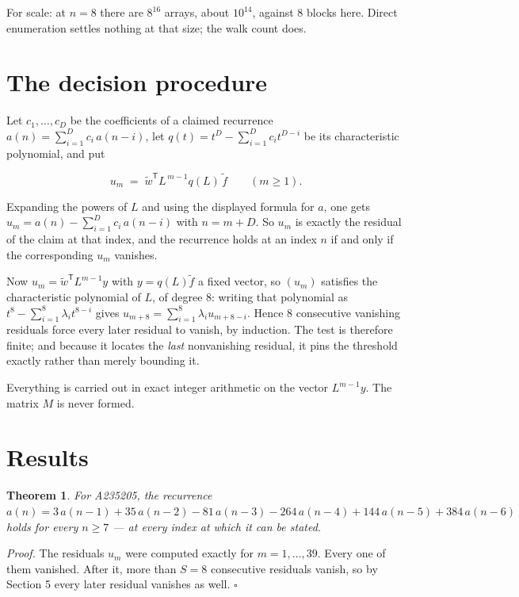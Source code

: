 \documentclass[11pt]{article}
\newtheorem{theorem}{Theorem}
\theoremstyle{definition}
\begin{document}
For scale: at $n = 8$ there are $8^{16}$ arrays, about $10^{14}$, against $8$ blocks here. Direct enumeration settles nothing at that size; the walk count does.

\section{The decision procedure}

Let $c_1,\dots,c_D$ be the coefficients of a claimed recurrence $a(n) = \sum_{i=1}^{D} c_i\,a(n-i)$, let $q(t) = t^{D} - \sum_{i=1}^{D} c_i t^{D-i}$ be its characteristic polynomial, and put

\[u_m \;=\; \tilde w^{\mathsf T} L^{\,m-1} q(L)\,\tilde f \qquad (m \ge 1).\]

Expanding the powers of $L$ and using the displayed formula for $a$, one gets $u_m = a(n) - \sum_{i=1}^{D} c_i\,a(n-i)$ with $n = m + D$. So $u_m$ is exactly the residual of the claim at that index, and the recurrence holds at an index $n$ if and only if the corresponding $u_m$ vanishes.

Now $u_m = \tilde w^{\mathsf T} L^{m-1} y$ with $y = q(L)\tilde f$ a fixed vector, so $(u_m)$ satisfies the characteristic polynomial of $L$, of degree $8$: writing that polynomial as $t^{8} - \sum_{i=1}^{8} \lambda_i t^{8-i}$ gives $u_{m+8} = \sum_{i=1}^{8} \lambda_i u_{m+8-i}$. Hence $8$ consecutive vanishing residuals force every later residual to vanish, by induction. The test is therefore finite; and because it locates the {\itshape last} nonvanishing residual, it pins the threshold exactly rather than merely bounding it.

Everything is carried out in exact integer arithmetic on the vector $L^{m-1}y$. The matrix $M$ is never formed.

\section{Results}

\begin{theorem} For A235205, the recurrence $a(n) = 3\,a(n-1) + 35\,a(n-2) - 81\,a(n-3) - 264\,a(n-4) + 144\,a(n-5) + 384\,a(n-6)$ holds for every $n \ge 7$ --- at every index at which it can be stated.\end{theorem}

{\itshape Proof.} The residuals $u_m$ were computed exactly for $m = 1,\dots,39$. Every one of them vanished. After it, more than $S = 8$ consecutive residuals vanish, so by Section 5 every later residual vanishes as well. $\square$
\end{document}
